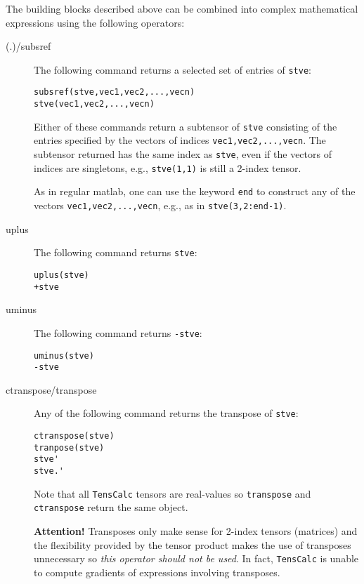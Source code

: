 \documentclass[11pt]{article}
\newcommand{\TC}{\texttt{TensCalc}}
\theoremstyle{remark}
\begin{document}
The building blocks described above can be combined into complex
mathematical expressions using the following operators:
\begin{description}
\item[(.)/subsref] The following command returns a selected set of
  entries of \lstinline{stve}:
\begin{lstlisting}
subsref(stve,vec1,vec2,...,vecn)
stve(vec1,vec2,...,vecn)
\end{lstlisting}
  Either of these commands return a subtensor of \lstinline{stve}
  consisting of the entries specified by the vectors of indices
  \lstinline{vec1,vec2,...,vecn}. The subtensor returned has the same
  index as \lstinline{stve}, even if the vectors of indices are
  singletons, e.g., \lstinline{stve(1,1)} is still a 2-index tensor.

  \medskip

  As in regular matlab, one can use the keyword \lstinline{end} to
  construct any of the vectors \lstinline{vec1,vec2,...,vecn}, e.g.,
  as in \lstinline{stve(3,2:end-1)}.
  

\item[uplus] The following command returns \lstinline{stve}:
\begin{lstlisting}
uplus(stve)
+stve
\end{lstlisting}

\item[uminus] The following command returns \lstinline{-stve}:
\begin{lstlisting}
uminus(stve)
-stve
\end{lstlisting}

\item[ctranspose/transpose] Any of the following command returns the
  transpose of \lstinline{stve}:
\begin{lstlisting}
ctranspose(stve)
tranpose(stve)
stve'
stve.'
\end{lstlisting}
Note that all \TC{} tensors are real-values so \lstinline{transpose}
and \lstinline{ctranspose} return the same object. 

\textbf{Attention!} Transposes only make sense for 2-index tensors
(matrices) and the flexibility provided by the tensor product makes
the use of transposes unnecessary so \emph{this operator should not be
  used}. In fact, \TC{} is unable to compute gradients of expressions
involving transposes.


\end{description}
\end{document}
